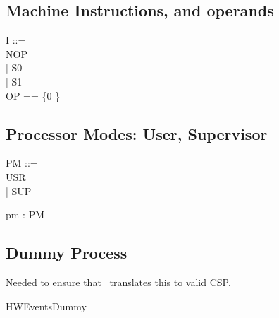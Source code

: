 \subsection{Machine Instructions, and operands} %
\begin{circus}
I ::=\\
  NOP\\   %
  | S0\\    %
  | S1\\    %

OP == \{0 \}
\end{circus}

\subsection{Processor Modes: User, Supervisor} %
\begin{circus}
PM ::=\\
 USR\\
 | SUP
\end{circus}

\begin{circus}
\circchannel pm : PM
\end{circus}

\subsection{Dummy Process}

Needed to ensure that \CTOC\ translates this to valid CSP.

\begin{circus}
\circprocess HWEventsDummy \circdef
\\ \circbegin
\\ \circspot
      \Skip
\\ \circend
\end{circus}
